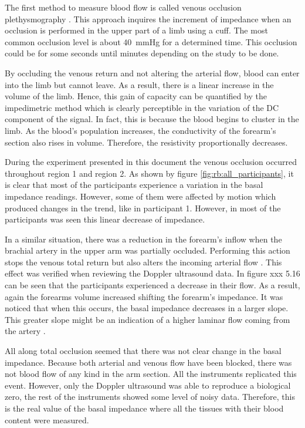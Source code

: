 The first method to measure blood flow is called venous occlusion plethysmography \cite{wilkinson2001venous}. This approach inquires the increment of impedance when an occlusion is performed in the upper part of a limb using a cuff. The most common occlusion level is about \SI{40}{\mmHg} for a determined time. This occlusion could be for some seconds until minutes depending on the study to be done. 

By occluding the venous return and not altering the arterial flow, blood can enter into the limb but cannot leave.  As a result, there is a linear increase in the volume of the limb. Hence, this gain of capacity can be quantified by the impedimetric method which is clearly perceptible in the variation of the DC component of the signal. In fact, this is because the blood begins to cluster in the limb. As the blood's population increases, the conductivity of the forearm's section also rises in volume. Therefore, the resistivity proportionally decreases. 

During the experiment presented in this document the venous occlusion occurred throughout region 1 and region 2.  As shown by figure \ref{fig:rb:all_participants}, it is clear that most of the participants experience a variation in the basal impedance readings.  However, some of them were affected by motion which produced changes in the trend, like in participant 1. However, in most of the participants was seen this linear decrease of impedance. 

In a similar situation, there was a reduction in the forearm's inflow when the brachial artery in the upper arm was partially occluded. Performing this action stops the venous total return but also alters the incoming arterial flow . This effect was verified when reviewing the Doppler ultrasound data. In figure xxx 5.16 can be seen that the participants experienced a decrease in their flow. As a result, again the forearms volume increased shifting the forearm's impedance. It was noticed that when this occurs, the basal impedance decreases in a larger slope. This greater slope might be an indication of a higher laminar flow coming from the artery .  

All along total occlusion seemed that there was not clear change in the basal impedance.  Because both arterial and venous flow have been blocked, there was not blood flow of any kind in the arm section. All the instruments replicated this event. However, only the Doppler ultrasound was able to reproduce a biological zero, the rest of the instruments showed some level of noisy data.   Therefore, this is the real value of the basal impedance where all the tissues with their blood content were measured.  


